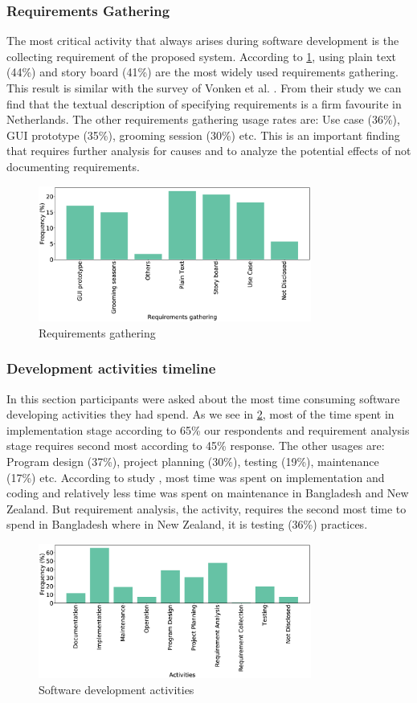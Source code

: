 \subsubsection{Requirements Gathering}
The most critical activity that always arises during software development is the collecting requirement of the proposed system. According to \ref{fig:requirements}, using plain text (44\%) and story board (41\%) are the most widely used requirements gathering. This result is similar with the survey of Vonken et al. \cite{Vonken2012}. From their study we can find that the textual description of specifying requirements is a firm favourite in Netherlands. The other requirements gathering usage rates are: Use case (36\%), GUI prototype (35\%), grooming session (30\%) etc. This is an important finding that requires further analysis for causes and to analyze the potential effects of not documenting requirements.
\begin{figure}[htbp]
\centering
  \includegraphics[width=0.8\textwidth]{Figures/Requirements_Gathering}
  \caption{Requirements gathering}
  \label{fig:requirements}
\end{figure}

\subsubsection{Development activities timeline}
In this section participants were asked about the most time consuming software developing activities they had spend. As we see in \ref{fig:activities}, most of the time spent in implementation stage according to 65\% our respondents and requirement analysis stage requires second most according to 45\% response. The other usages are: Program design (37\%), project planning (30\%), testing (19\%), maintenance (17\%) etc. According to study \cite{Wang2018}, most time was spent on implementation and coding and relatively less time was spent on maintenance in Bangladesh and New Zealand. But requirement analysis, the activity, requires the second most time to spend in Bangladesh where in New Zealand, it is testing (36\%) practices.

\begin{figure}[htbp]
\centering
  \includegraphics[width=0.8\textwidth]{Figures/Respondents_Activities}
  \caption{Software development activities}
  \label{fig:activities}
\end{figure}

